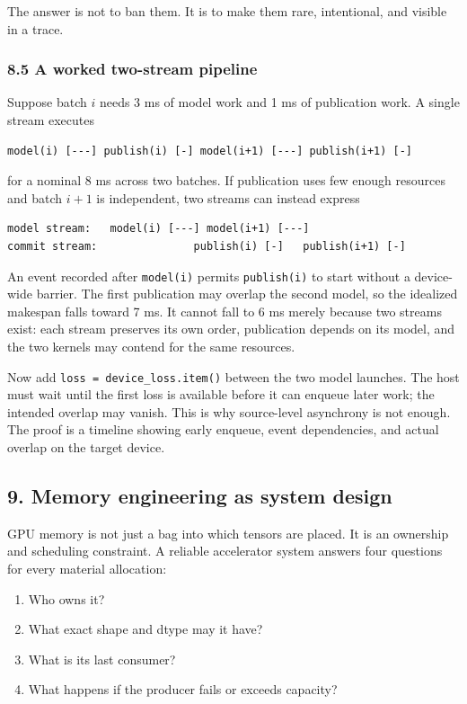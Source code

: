 \documentclass[
  10pt,
  letterpaper,
]{article}
\providecommand{\tightlist}{%
  \setlength{\itemsep}{0pt}\setlength{\parskip}{0pt}}
\begin{document}
The answer is not to ban them. It is to make them rare, intentional, and
visible in a trace.

\subsubsection{8.5 A worked two-stream
pipeline}\label{85-a-worked-two-stream-pipeline}

Suppose batch \(i\) needs 3 ms of model work and 1 ms of publication
work. A single stream executes

\begin{verbatim}
model(i) [---] publish(i) [-] model(i+1) [---] publish(i+1) [-]
\end{verbatim}

for a nominal 8 ms across two batches. If publication uses few enough
resources and batch \(i+1\) is independent, two streams can instead
express

\begin{verbatim}
model stream:   model(i) [---] model(i+1) [---]
commit stream:               publish(i) [-]   publish(i+1) [-]
\end{verbatim}

An event recorded after \texttt{model(i)} permits \texttt{publish(i)} to
start without a device-wide barrier. The first publication may overlap
the second model, so the idealized makespan falls toward 7 ms. It cannot
fall to 6 ms merely because two streams exist: each stream preserves its
own order, publication depends on its model, and the two kernels may
contend for the same resources.

Now add \texttt{loss\ =\ device\_loss.item()} between the two model
launches. The host must wait until the first loss is available before it
can enqueue later work; the intended overlap may vanish. This is why
source-level asynchrony is not enough. The proof is a timeline showing
early enqueue, event dependencies, and actual overlap on the target
device.

\subsection{9. Memory engineering as system
design}\label{9-memory-engineering-as-system-design}

GPU memory is not just a bag into which tensors are placed. It is an
ownership and scheduling constraint. A reliable accelerator system
answers four questions for every material allocation:

\begin{enumerate}
\def\labelenumi{\arabic{enumi}.}
\tightlist
\item
  Who owns it?
\item
  What exact shape and dtype may it have?
\item
  What is its last consumer?
\item
  What happens if the producer fails or exceeds capacity?
\end{enumerate}
\end{document}
